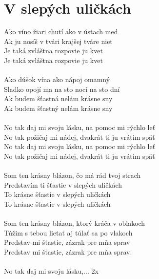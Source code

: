 \section{V slepých uličkách}
\color{blue}
Ako víno žiari chutí ako v ústach med\\
Ak ju nosíš v tvári krajšej tváre niet\\
Je taká zvláštna rozpovie ju kvet\\
Je taká zvláštna rozpovie ju kvet\\
\\
\color{red}
Ako dúšok vína ako nápoj omamný\\
Sladko opojí ma na sto nocí na sto dní\\
Ak budem šťastná nelám krásne sny\\
\color{blue}
Ak budem šťastný nelám krásne sny\\
\\
\color{black}
No tak daj mi svoju lásku, na pomoc mi rýchlo leť\\
No tak požičaj mi nádej, dvakrát ti ju vrátim späť\\
No tak daj mi svoju lásku, na pomoc mi rýchlo leť\\
No tak požičaj mi nádej, dvakrát ti ju vrátim späť\\
\\
\color{blue}
Som ten krásny blázon, čo má rád tvoj strach\\
Predstavím ti šťastie v slepých uličkách\\
To krásne šťastie v slepých uličkách\\
To krásne šťastie v slepých uličkách\\
\\
\color{red}
Som ten krásny blázon, ktorý kráča v oblakoch\\
Túžim s tebou lietať aj túlať sa po vlakoch\\
Predstav mi šťastie, zázrak pre mňa sprav\\
\color{blue}
Predstav mi šťastie, zázrak pre mňa sprav.\\
\\
\color{black}
No tak daj mi svoju lásku,... 2x\\\